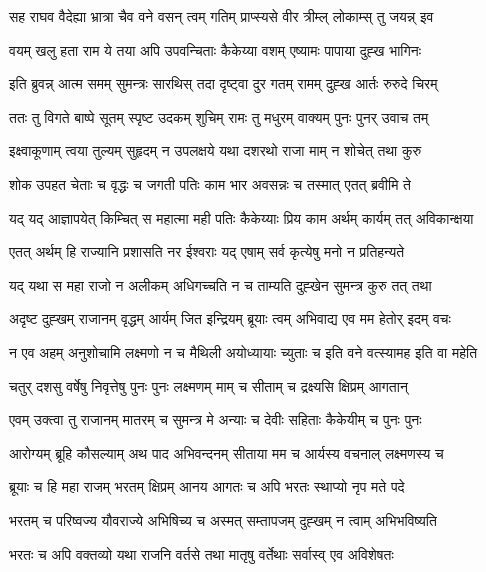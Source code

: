 \twolineshloka
{सह राघव वैदेह्या भ्रात्रा चैव वने वसन्}
{त्वम् गतिम् प्राप्स्यसे वीर त्रीम्ल् लोकाम्स् तु जयन्न् इव} %

\twolineshloka
{वयम् खलु हता राम ये तया अपि उपवन्चिताः}
{कैकेय्या वशम् एष्यामः पापाया दुह्ख भागिनः} %

\twolineshloka
{इति ब्रुवन्न् आत्म समम् सुमन्त्रः सारथिस् तदा}
{दृष्ट्वा दुर गतम् रामम् दुह्ख आर्तः रुरुदे चिरम्} %

\twolineshloka
{ततः तु विगते बाष्पे सूतम् स्पृष्ट उदकम् शुचिम्}
{रामः तु मधुरम् वाक्यम् पुनः पुनर् उवाच तम्} %

\twolineshloka
{इक्ष्वाकूणाम् त्वया तुल्यम् सुहृदम् न उपलक्षये}
{यथा दशरथो राजा माम् न शोचेत् तथा कुरु} %

\twolineshloka
{शोक उपहत चेताः च वृद्धः च जगती पतिः}
{काम भार अवसन्नः च तस्मात् एतत् ब्रवीमि ते} %

\twolineshloka
{यद् यद् आज्ञापयेत् किम्चित् स महात्मा मही पतिः}
{कैकेय्याः प्रिय काम अर्थम् कार्यम् तत् अविकान्क्षया} %

\twolineshloka
{एतत् अर्थम् हि राज्यानि प्रशासति नर ईश्वराः}
{यद् एषाम् सर्व कृत्येषु मनो न प्रतिहन्यते} %

\twolineshloka
{यद् यथा स महा राजो न अलीकम् अधिगच्चति}
{न च ताम्यति दुह्खेन सुमन्त्र कुरु तत् तथा} %

\twolineshloka
{अदृष्ट दुह्खम् राजानम् वृद्धम् आर्यम् जित इन्द्रियम्}
{ब्रूयाः त्वम् अभिवाद्य एव मम हेतोर् इदम् वचः} %

\twolineshloka
{न एव अहम् अनुशोचामि लक्ष्मणो न च मैथिली}
{अयोध्यायाः च्युताः च इति वने वत्स्यामह इति वा महेति} %

\twolineshloka
{चतुर् दशसु वर्षेषु निवृत्तेषु पुनः पुनः}
{लक्ष्मणम् माम् च सीताम् च द्रक्ष्यसि क्षिप्रम् आगतान्} %

\twolineshloka
{एवम् उक्त्वा तु राजानम् मातरम् च सुमन्त्र मे}
{अन्याः च देवीः सहिताः कैकेयीम् च पुनः पुनः} %

\twolineshloka
{आरोग्यम् ब्रूहि कौसल्याम् अथ पाद अभिवन्दनम्}
{सीताया मम च आर्यस्य वचनाल् लक्ष्मणस्य च} %

\twolineshloka
{ब्रूयाः च हि महा राजम् भरतम् क्षिप्रम् आनय}
{आगतः च अपि भरतः स्थाप्यो नृप मते पदे} %

\twolineshloka
{भरतम् च परिष्वज्य यौवराज्ये अभिषिच्य च}
{अस्मत् सम्तापजम् दुह्खम् न त्वाम् अभिभविष्यति} %

\twolineshloka
{भरतः च अपि वक्तव्यो यथा राजनि वर्तसे}
{तथा मातृषु वर्तेथाः सर्वास्व् एव अविशेषतः} %

